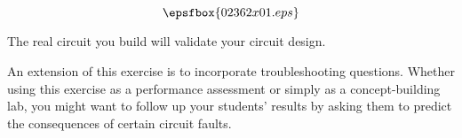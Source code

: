 

$$\epsfbox{02362x01.eps}$$

\vfil \eject






The real circuit you build will validate your circuit design.







An extension of this exercise is to incorporate troubleshooting questions.  Whether using this exercise as a performance assessment or simply as a concept-building lab, you might want to follow up your students' results by asking them to predict the consequences of certain circuit faults.




